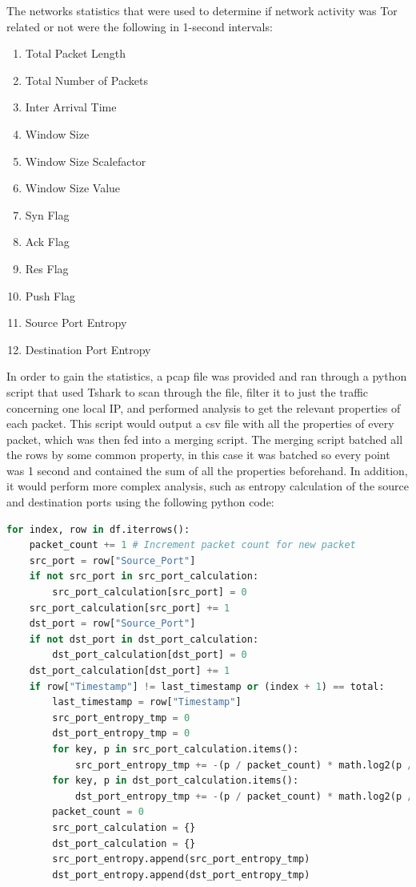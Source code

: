 \documentclass[conference,12pt]{IEEEtran}
\begin{document}
The networks statistics that were used to determine if network activity was Tor related or not were the following in 1-second intervals:
\begin{enumerate}
    \item Total Packet Length
    \item Total Number of Packets
    \item Inter Arrival Time
    \item Window Size
    \item Window Size Scalefactor
    \item Window Size Value
    \item Syn Flag
    \item Ack Flag
    \item Res Flag
    \item Push Flag
    \item Source Port Entropy
    \item Destination Port Entropy
\end{enumerate}

In order to gain the statistics, a pcap file was provided and ran through a python script that used Tshark to scan through the file, filter it to just the traffic concerning one local IP, and performed analysis to get the relevant properties of each packet. This script would output a csv file with all the properties of every packet, which was then fed into a merging script. The merging script batched all the rows by some common property, in this case it was batched so every point was 1 second and contained the sum of all the properties beforehand. In addition, it would perform more complex analysis, such as entropy calculation of the source and destination ports using the following python code:

\begin{lstlisting}[language=Python, breaklines=true]
for index, row in df.iterrows():
    packet_count += 1 # Increment packet count for new packet
    src_port = row["Source_Port"]
    if not src_port in src_port_calculation:
        src_port_calculation[src_port] = 0
    src_port_calculation[src_port] += 1
    dst_port = row["Source_Port"]
    if not dst_port in dst_port_calculation:
        dst_port_calculation[dst_port] = 0
    dst_port_calculation[dst_port] += 1
    if row["Timestamp"] != last_timestamp or (index + 1) == total:
        last_timestamp = row["Timestamp"]
        src_port_entropy_tmp = 0
        dst_port_entropy_tmp = 0
        for key, p in src_port_calculation.items():
            src_port_entropy_tmp += -(p / packet_count) * math.log2(p / packet_count)
        for key, p in dst_port_calculation.items():
            dst_port_entropy_tmp += -(p / packet_count) * math.log2(p / packet_count)
        packet_count = 0
        src_port_calculation = {}
        dst_port_calculation = {}
        src_port_entropy.append(src_port_entropy_tmp)
        dst_port_entropy.append(dst_port_entropy_tmp)
\end{lstlisting}
\end{document}
